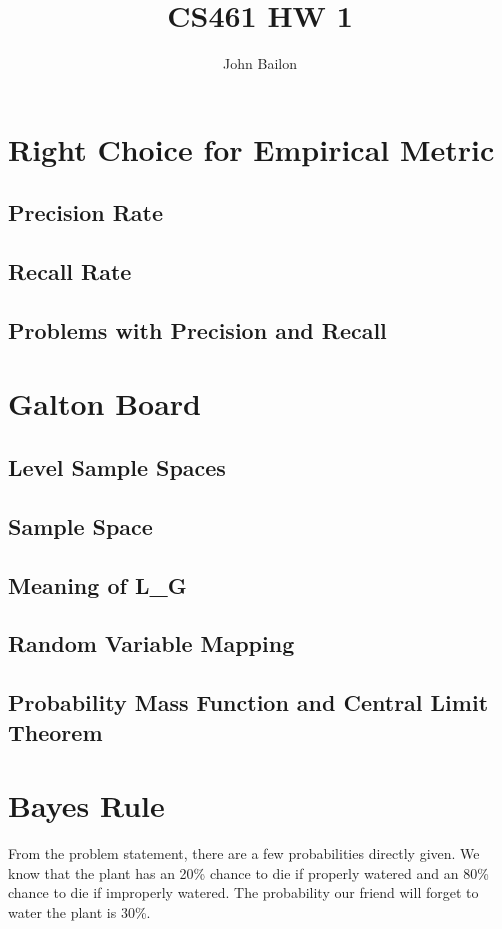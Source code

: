 \documentclass{article}
\title{CS461 HW 1}
\author{John Bailon}
\begin{document}
\maketitle

\section{Right Choice for Empirical Metric}

\subsection{Precision Rate}
\subsection{Recall Rate}
\subsection{Problems with Precision and Recall}

\section{Galton Board}

\subsection{Level Sample Spaces}
\subsection{Sample Space}
\subsection{Meaning of L_G}
\subsection{Random Variable Mapping}
\subsection{Probability Mass Function and Central Limit Theorem}

\section{Bayes Rule}

From the problem statement, there are a few probabilities directly given. We know that the plant has an 20\% chance to die if properly watered and an 80\% chance to die if improperly watered. The probability our friend will forget to water the plant is 30\%.
\end{document}
